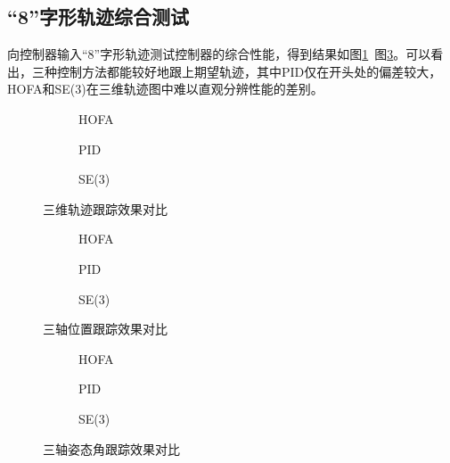 \subsection*{“8”字形轨迹综合测试}
  向控制器输入“8”字形轨迹测试控制器的综合性能，得到结果如图\ref{MATLAB_3d}~图\ref{MATLAB_angle}。可以看出，三种控制方法都能较好地跟上期望轨迹，其中PID仅在开头处的偏差较大，HOFA和SE(3)在三维轨迹图中难以直观分辨性能的差别。
  \begin{figure}[!h]
      \centering
      \begin{subfigure}[t]{0.49\textwidth}
        \centering
        \caption{HOFA}
      \end{subfigure}\hfill
      \begin{subfigure}[t]{0.49\textwidth}
        \centering
        \caption{PID}
      \end{subfigure}\hfill
      \begin{subfigure}[t]{0.49\textwidth}
        \centering
        \caption{SE(3)}
      \end{subfigure}
      \caption{三维轨迹跟踪效果对比}
      \label{MATLAB_3d}
  \end{figure}
  \begin{figure}[!h]
    \centering
    \begin{subfigure}[t]{0.49\textwidth}
      \centering
      \caption{HOFA}
    \end{subfigure}\hfill
    \begin{subfigure}[t]{0.49\textwidth}
      \centering
      \caption{PID}
    \end{subfigure}\hfill
    \begin{subfigure}[t]{0.49\textwidth}
      \centering
      \caption{SE(3)}
    \end{subfigure}
    \caption{三轴位置跟踪效果对比}
    \label{MATLAB_x}
\end{figure}

\begin{figure}[!h]
  \centering
  \begin{subfigure}[t]{0.49\textwidth}
    \centering
    \caption{HOFA}
  \end{subfigure}\hfill
  \begin{subfigure}[t]{0.49\textwidth}
    \centering
    \caption{PID}
  \end{subfigure}\hfill
  \begin{subfigure}[t]{0.49\textwidth}
    \centering
    \caption{SE(3)}
  \end{subfigure}
  \caption{三轴姿态角跟踪效果对比}
  \label{MATLAB_angle}
\end{figure}

